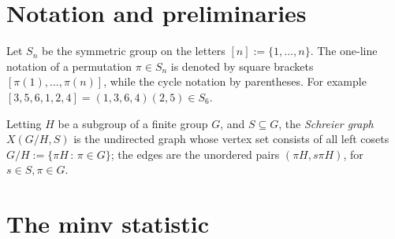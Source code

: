 \documentclass[11pt]{amsart}
\newtheorem{observation}[theorem]{Observation}
\newtheorem{question}[theorem]{Question}
\numberwithin{equation}{section}
\newcommand{\ZZ}{{\mathbb {Z}}}
\newcommand{\inv}{{\operatorname{inv}}}
\newcommand{\minv}{{\operatorname{minv}}}
\begin{document}








\section{Notation and preliminaries}

Let $S_n$ be the symmetric group on the letters $[n]:=\{1,\dots, n\}$. The one-line notation of a permutation $\pi\in S_n$ is denoted by square brackets $[\pi(1),\dots,\pi(n)]$, while the cycle notation by parentheses. For example $[3,5,6,1,2,4]=(1,3,6,4)(2,5)\in S_6$.

Letting $H$ be a subgroup of a finite group $G$, and $S\subseteq  G$, the {\em Schreier graph} $X(G/H,S)$ is the undirected graph whose vertex set consists of all left cosets $G/H:=\{\pi H\, :\, \pi\in G\}$; the edges are the unordered pairs $(\pi H, s\pi H)$, for $s\in S, \pi\in G$. 



\section{The minv statistic}

\end{document}
